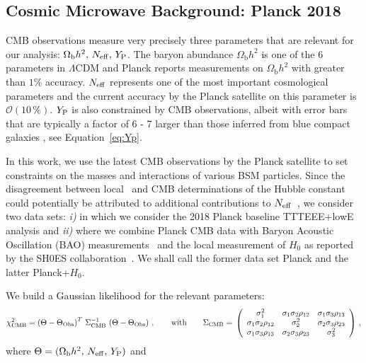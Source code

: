 \documentclass[notitlepage,letterpaper,natbib,aps,prd,onecolumn,amsmath,amsfonts,nofootinbib,preprintnumbers,superscriptaddress,secnumarabic,groupedaddress]{revtex4-1}
\begin{document}
\subsection{Cosmic Microwave Background: Planck 2018}\label{sec:CMB_data}
CMB observations measure very precisely three parameters that are relevant for our analysis: $\Omega_\mathrm{b} h^2,\,N_{\rm eff},\,Y_{\rm P}$. The baryon abundance $\Omega_\mathrm{b} h^2$ is one of the 6 parameters in $\Lambda$CDM and Planck reports measurements on $\Omega_\mathrm{b} h^2$ with greater than $1\%$ accuracy. $N_{\rm eff}$ represents one of the most important cosmological parameters and the current accuracy by the Planck satellite on this parameter is $\mathcal{O}(10\,\%)$. $Y_{\rm P}$ is also constrained by CMB observations, albeit with error bars that are typically a factor of 6 - 7 larger than those inferred from blue compact galaxies \cite{pdg}, see Equation~\eqref{eq:Yp}.

In this work, we use the latest CMB observations by the Planck satellite to set constraints on the masses and interactions of various BSM particles. Since the disagreement between local~\cite{Riess:2019cxk} and CMB determinations of the Hubble constant~\cite{Aghanim:2018eyx} could potentially be attributed to additional contributions to $N_{\rm eff}$~\cite{Bernal:2016gxb,Verde:2019ivm}, we consider two data sets: \textit{i)} in which we consider the 2018 Planck baseline TTTEEE+lowE analysis and \textit{ii)} where we combine Planck CMB data with Baryon Acoustic Oscillation (BAO) measurements~\cite{Beutler:2011hx,Ross:2014qpa,Alam:2016hwk} and the local measurement of $H_0$ as reported by the SH0ES collaboration~\cite{Riess:2019cxk}. We shall call the former data set Planck and the latter Planck+$H_0$.  

We build a Gaussian likelihood for the relevant parameters:
\begin{align}\label{eq:chi2_CMB}
\chi_{\rm CMB}^2  = \left(\Theta - \Theta_{\rm Obs}\right)^T \,  \Sigma_{\rm CMB}^{-1} \,\left(\Theta - \Theta_{\rm Obs}\right)\, , \qquad \text{with} \qquad \Sigma_{\rm CMB} = \,
 \left(
\begin{array}{ccc}
\sigma_1^2 & \sigma_1 \sigma_2 \rho_{12} & \sigma_1 \sigma_3 \rho_{13}  \\
\sigma_1 \sigma_2 \rho_{12}     & \sigma_2^2 & \sigma_2 \sigma_3 \rho_{23} \\
\sigma_1 \sigma_3 \rho_{13}     & \sigma_2 \sigma_3 \rho_{23}        & \sigma_3^2 \\
\end{array}
\right) \,, 
\end{align}
where $\Theta = (\Omega_\mathrm{b} h^2,\,N_{\rm eff},\,Y_{\rm P})$ and
\end{document}

